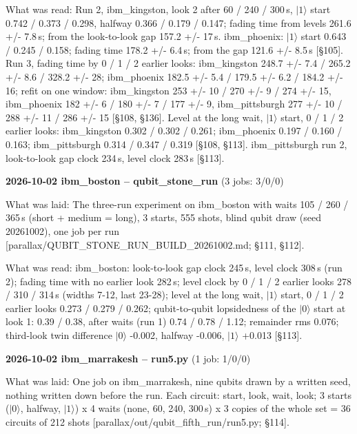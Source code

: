 \documentclass[11pt]{article}
\begin{document}
What was read: Run 2, ibm\_kingston, look 2 after 60 / 240 / 300\,\textmu s, \(|1\rangle\) start 0.742 / 0.373 / 0.298, halfway 0.366 / 0.179 / 0.147; fading time from levels 261.6 +/- 7.8\,\textmu s; from the look-to-look gap 157.2 +/- 17\,\textmu s. ibm\_phoenix: \(|1\rangle\) start 0.643 / 0.245 / 0.158; fading time 178.2 +/- 6.4\,\textmu s; from the gap 121.6 +/- 8.5\,\textmu s {[}\S{}105{]}. Run 3, fading time by 0 / 1 / 2 earlier looks: ibm\_kingston 248.7 +/- 7.4 / 265.2 +/- 8.6 / 328.2 +/- 28; ibm\_phoenix 182.5 +/- 5.4 / 179.5 +/- 6.2 / 184.2 +/- 16; refit on one window: ibm\_kingston 253 +/- 10 / 270 +/- 9 / 274 +/- 15, ibm\_phoenix 182 +/- 6 / 180 +/- 7 / 177 +/- 9, ibm\_pittsburgh 277 +/- 10 / 288 +/- 11 / 286 +/- 15 {[}\S{}108, \S{}136{]}. Level at the long wait, \(|1\rangle\) start, 0 / 1 / 2 earlier looks: ibm\_kingston 0.302 / 0.302 / 0.261; ibm\_phoenix 0.197 / 0.160 / 0.163; ibm\_pittsburgh 0.314 / 0.347 / 0.319 {[}\S{}108, \S{}113{]}. ibm\_pittsburgh run 2, look-to-look gap clock 234\,\textmu s, level clock 283\,\textmu s {[}\S{}113{]}.

\textbf{2026-10-02 ibm\_boston -- qubit\_stone\_run} (3 jobs: 3/0/0)

What was laid: The three-run experiment on ibm\_boston with waits 105 / 260 / 365\,\textmu s (short + medium = long), 3 starts, 555 shots, blind qubit draw (seed 20261002), one job per run {[}parallax/QUBIT\_STONE\_RUN\_BUILD\_20261002.md; \S{}111, \S{}112{]}.

What was read: ibm\_boston: look-to-look gap clock 245\,\textmu s, level clock 308\,\textmu s (run 2); fading time with no earlier look 282\,\textmu s; level clock by 0 / 1 / 2 earlier looks 278 / 310 / 314\,\textmu s (widths 7-12, last 23-28); level at the long wait, \(|1\rangle\) start, 0 / 1 / 2 earlier looks 0.273 / 0.279 / 0.262; qubit-to-qubit lopsidedness of the \(|0\rangle\) start at look 1: 0.39 / 0.38, after waits (run 1) 0.74 / 0.78 / 1.12; remainder rms 0.076; third-look twin difference \(|0\rangle\) -0.002, halfway -0.006, \(|1\rangle\) +0.013 {[}\S{}113{]}.

\textbf{2026-10-02 ibm\_marrakesh -- run5.py} (1 job: 1/0/0)

What was laid: One job on ibm\_marrakesh, nine qubits drawn by a written seed, nothing written down before the run. Each circuit: start, look, wait, look; 3 starts (\(|0\rangle\), halfway, \(|1\rangle\)) x 4 waits (none, 60, 240, 300\,\textmu s) x 3 copies of the whole set = 36 circuits of 212 shots {[}parallax/out/qubit\_fifth\_run/run5.py; \S{}114{]}.
\end{document}
